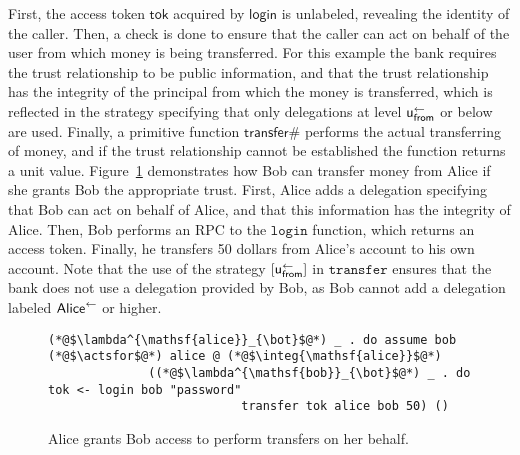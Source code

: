 First, the access token $\mathsf{tok}$ acquired by $\mathsf{login}$ is unlabeled, revealing the identity of the caller. Then, a check is done to ensure that the caller can act on behalf of the user from which money is being transferred. For this example the bank requires the trust relationship to be public information, and that the trust relationship has the integrity of the principal from which the money is transferred, which is reflected in the strategy specifying that only delegations at level $\mathsf{u}_{\mathsf{from}}^{\leftarrow}$ or below are used. Finally, a primitive function $\mathsf{transfer\#}$ performs the actual transferring of money, and if the trust relationship cannot be established the function returns a unit value. Figure~\ref{fig:bob-transfer-from-alice} demonstrates how Bob can transfer money from Alice if she grants Bob the appropriate trust. First, Alice adds a delegation specifying that Bob can act on behalf of Alice, and that this information has the integrity of Alice. Then, Bob performs an RPC to the $\mathtt{login}$ function, which returns an access token. Finally, he transfers 50 dollars from Alice's account to his own account. Note that the use of the strategy $[\mathsf{u}_{\mathsf{from}}^{\leftarrow}]$ in $\mathtt{transfer}$ ensures that the bank does not use a delegation provided by Bob, as Bob cannot add a delegation labeled $\mathsf{Alice}^{\leftarrow}$ or higher.

\begin{figure}
\centering
\begin{lstlisting}
(*@$\lambda^{\mathsf{alice}}_{\bot}$@*) _ . do assume bob (*@$\actsfor$@*) alice @ (*@$\integ{\mathsf{alice}}$@*)
              ((*@$\lambda^{\mathsf{bob}}_{\bot}$@*) _ . do tok <- login bob "password"
                           transfer tok alice bob 50) ()
\end{lstlisting}
\caption{Alice grants Bob access to perform transfers on her behalf.}
\label{fig:bob-transfer-from-alice}
\end{figure}